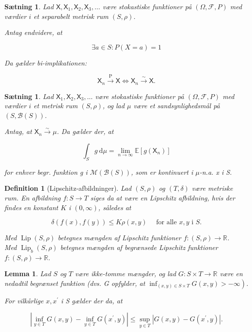 \documentclass{article}
\newcommand{\1}{\mathbbm{1}}
\newcommand{\X}{\mathsf{X}}
\theoremstyle{boxed}
\newtheorem{definition}[theorem]{Definition}
\newtheorem{lemma}[theorem]{Lemma}
\newtheorem{proposition}[theorem]{Sætning}
\begin{document}
\begin{theorem-box}
    \begin{proposition}
        Lad $\X, \X_1, \X_2, \X_3, \ldots$ være stokastiske funktioner på $(\Omega, \mathcal{F}, P)$ med værdier $i$ et separabelt metrisk rum $(S, \rho)$.

Antag endvidere, at

$$
\exists a \in S: P(X=a)=1
$$


Da gælder bi-implikationen:

$$
\X_n \xrightarrow{\mathrm{P}} \X \Longleftrightarrow \X_n \xrightarrow{\sim} \X .
$$

    \end{proposition}
\end{theorem-box}
\begin{theorem-box}
    \begin{proposition}
        Lad $\X_1, \X_2, \X_3, \ldots$ være stokastiske funktioner på $(\Omega, \mathcal{F}, P)$ med værdier $i$ et metrisk rum $(S, \rho)$, og lad $\mu$ være et sandsynlighedsmål på $(S, \mathcal{B}(S))$.

Antag, at $\X_n \xrightarrow{\sim} \mu$.
Da gælder der, at

$$
\int_S g \mathrm{~d} \mu=\lim _{n \rightarrow \infty} \mathbb{E}\left[g\left(\X_n\right)\right]
$$

for enhver begr. funktion g i $\mathcal{M}(\mathcal{B}(S))$, som er kontinuert i $\mu$-n.a. x i S.
    \end{proposition}
\end{theorem-box}
\begin{theorem-box}
    \begin{definition}[Lipschitz-afbildninger]
        Lad $(S, \rho)$ og $(T, \delta)$ være metriske rum.
En afbildning $f: S \rightarrow T$ siges da at være en Lipschitz afbildning, hvis der findes en konstant $K$ i $(0, \infty)$, således at

$$
\delta(f(x), f(y)) \leq K \rho(x, y) \quad \text { for alle } x, y \text { i } S .
$$


Med $\operatorname{Lip}(S, \rho)$ betegnes mængden af Lipschitz funktioner $f:(S, \rho) \rightarrow \mathbb{R}$.
\\Med $\operatorname{Lip}_b(S, \rho)$ betegnes mængden af begrænsede Lipschitz funktioner $f:(S, \rho) \rightarrow \mathbb{R}$.
    \end{definition}
\end{theorem-box}
\begin{theorem-box}
    \begin{lemma}
        Lad $S$ og $T$ være ikke-tomme mængder, og lad $G: S \times T \rightarrow \mathbb{R}$ være en nedadtil begrænset funktion (dvs. G opfylder, at $\left.\inf _{(x, y) \in S \times T} G(x, y)>-\infty\right)$.

For vilkårlige $x, x^{\prime}$ i S gælder der da, at

$$
\left|\inf _{y \in T} G(x, y)-\inf _{y \in T} G\left(x^{\prime}, y\right)\right| \leq \sup _{y \in T}\left|G(x, y)-G\left(x^{\prime}, y\right)\right| .
$$

    \end{lemma}
\end{theorem-box}
\end{document}
